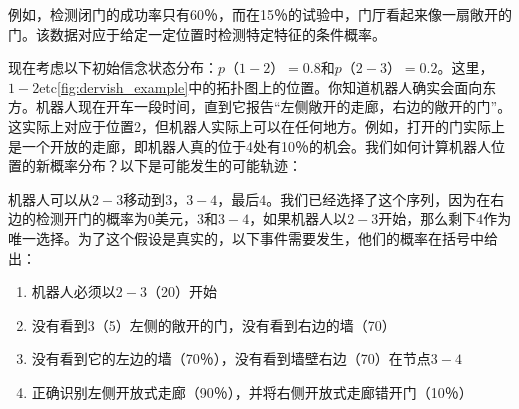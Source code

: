 

例如，检测闭门的成功率只有60％，而在15％的试验中，门厅看起来像一扇敞开的门。该数据对应于给定一定位置时检测特定特征的条件概率。

现在考虑以下初始信念状态分布：$p（1-2）=0.8$和$p（2-3）=0.2$。这里，$1-2$etc\ref{fig:dervish_example}中的拓扑图上的位置。你知道机器人确实会面向东方。机器人现在开车一段时间，直到它报告“左侧敞开的走廊，右边的敞开的门”。这实际上对应于位置2，但机器人实际上可以在任何地方。例如，打开的门实际上是一个开放的走廊，即机器人真的位于4处有10％的机会。我们如何计算机器人位置的新概率分布？以下是可能发生的可能轨迹：

机器人可以从$2-3$移动到$3$，$3-4$，最后$4$。我们已经选择了这个序列，因为在右边的检测开门的概率为0美元，$3$和$3-4$，如果机器人以$2-3$开始，那么剩下$4$作为唯一选择。为了这个假设是真实的，以下事件需要发生，他们的概率在括号中给出：

\begin{enumerate}

\item 机器人必须以$2-3$（20\％）开始
\item 没有看到$3$（5\％）左侧的敞开的门，没有看到右边的墙（70\％）
\item 没有看到它的左边的墙（70％），没有看到墙壁右边（70\％）在节点$3-4$
\item 正确识别左侧开放式走廊（90％），并将右侧开放式走廊错开门（10％）
\end{enumerate}

